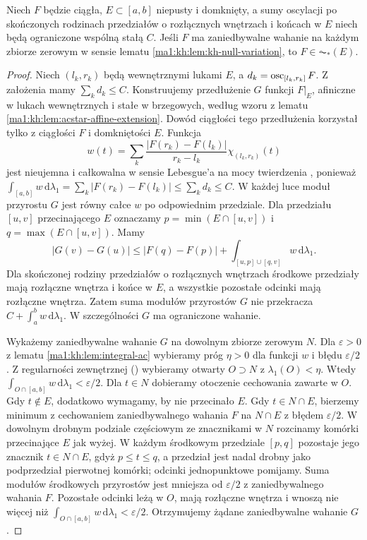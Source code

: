 \begin{lemat}
\label{ma1:kh:lem:bvstar-null-to-acstar}\label{it:lem:bvstar-null-to-acstar}
Niech $F$ będzie ciągła, $E\subset[a,b]$ niepusty i domknięty, a sumy oscylacji po skończonych rodzinach przedziałów o rozłącznych wnętrzach i końcach w $E$ niech będą ograniczone wspólną stałą $C$. Jeśli $F$ ma zaniedbywalne wahanie na każdym zbiorze zerowym w sensie lematu \ref{ma1:kh:lem:kh-null-variation}, to $F\in\AC_*(E)$.
\end{lemat}
\begin{proof}
Niech $(l_k,r_k)$ będą wewnętrznymi lukami $E$, a $d_k=\operatorname{osc}_{[l_k,r_k]}F$. Z założenia mamy $\sum_k d_k\le C$. Konstruujemy przedłużenie $G$ funkcji $F|_E$, afiniczne w lukach wewnętrznych i stałe w brzegowych, według wzoru z lematu \ref{ma1:kh:lem:acstar-affine-extension}. Dowód ciągłości tego przedłużenia korzystał tylko z ciągłości $F$ i domkniętości $E$. Funkcja
\[
 w(t)=\sum_k\frac{|F(r_k)-F(l_k)|}{r_k-l_k}\chi_{(l_k,r_k)}(t)
\]
jest nieujemna i całkowalna w sensie Lebesgue'a na mocy twierdzenia , ponieważ $\int_{[a,b]}w\,\mathrm d\lambda_1=\sum_k|F(r_k)-F(l_k)|\le\sum_k d_k\le C$. W każdej luce moduł przyrostu $G$ jest równy całce $w$ po odpowiednim przedziale. Dla przedziału $[u,v]$ przecinającego $E$ oznaczamy $p=\min(E\cap[u,v])$ i $q=\max(E\cap[u,v])$. Mamy
\[
 |G(v)-G(u)|\le |F(q)-F(p)|
 +\int_{[u,p]\cup[q,v]}w\,\mathrm d\lambda_1.
\]
Dla skończonej rodziny przedziałów o rozłącznych wnętrzach środkowe przedziały mają rozłączne wnętrza i końce w $E$, a wszystkie pozostałe odcinki mają rozłączne wnętrza. Zatem suma modułów przyrostów $G$ nie przekracza $C+\int_a^b w\,\mathrm d\lambda_1$. W szczególności $G$ ma ograniczone wahanie.

Wykażemy zaniedbywalne wahanie $G$ na dowolnym zbiorze zerowym $N$. Dla $\varepsilon>0$ z lematu \ref{ma1:kh:lem:integral-ac} wybieramy próg $\eta>0$ dla funkcji $w$ i błędu $\varepsilon/2$. Z regularności zewnętrznej () wybieramy otwarty $O\supset N$ z $\lambda_1(O)<\eta$. Wtedy $\int_{O\cap[a,b]}w\,\mathrm d\lambda_1<\varepsilon/2$. Dla $t\in N$ dobieramy otoczenie cechowania zawarte w $O$. Gdy $t\notin E$, dodatkowo wymagamy, by nie przecinało $E$. Gdy $t\in N\cap E$, bierzemy minimum z cechowaniem zaniedbywalnego wahania $F$ na $N\cap E$ z błędem $\varepsilon/2$. W dowolnym drobnym podziale częściowym ze znacznikami w $N$ rozcinamy komórki przecinające $E$ jak wyżej. W każdym środkowym przedziale $[p,q]$ pozostaje jego znacznik $t\in N\cap E$, gdyż $p\le t\le q$, a przedział jest nadal drobny jako podprzedział pierwotnej komórki; odcinki jednopunktowe pomijamy. Suma modułów środkowych przyrostów jest mniejsza od $\varepsilon/2$ z zaniedbywalnego wahania $F$. Pozostałe odcinki leżą w $O$, mają rozłączne wnętrza i wnoszą nie więcej niż $\int_{O\cap[a,b]}w\,\mathrm d\lambda_1<\varepsilon/2$. Otrzymujemy żądane zaniedbywalne wahanie $G$.


\end{proof}
